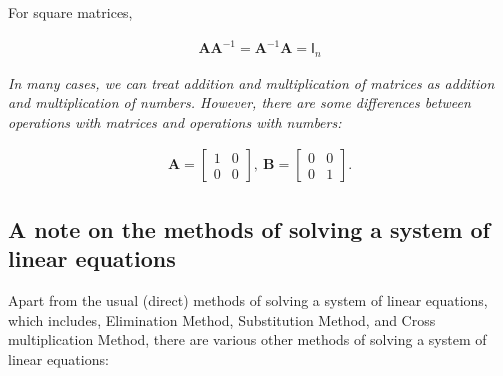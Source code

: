 \documentclass[12pt]{article}
\begin{document}
For square matrices,

\begin{align}
\mathbf{A}\mathbf{A}^{-1}=\mathbf{A}^{-1}\mathbf{A}=\mathsf{I}_{n}
\end{align}

\textit{In many cases, we can treat addition and multiplication of matrices as addition and multiplication of numbers. However, there are some differences between operations with matrices and operations with numbers:}


\begin{align}
\mathbf{A}= \begin{bmatrix} 1 & 0 \\ 0 & 0 \end{bmatrix},\ \mathbf{B}= \begin{bmatrix} 0 & 0 \\ 0 & 1 \end{bmatrix}.
\end{align}

\subsection{A note on the methods of solving a system of linear equations}

Apart from the usual (direct) methods of solving a system of linear equations, which includes, Elimination Method, Substitution Method, and Cross multiplication Method, there are various other methods of solving a system of linear equations:
\end{document}

